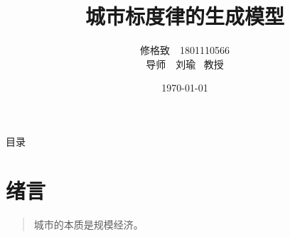 \documentclass[utf8]{ctexbeamer}
\begin{document}
\title{城市标度律的生成模型}
\author{修格致\ \ 1801110566 \\ \vspace{1cm} 导师\ \ 刘瑜 \ 教授}
\date{\today}



\begin{frame}
    \maketitle

\end{frame}

\begin{frame}{目录}
    \tableofcontents
\end{frame}

\section{绪言}


\begin{frame}
    \begin{quote}
        城市的本质是规模经济。


    \end{quote}
\end{frame}
\end{document}
